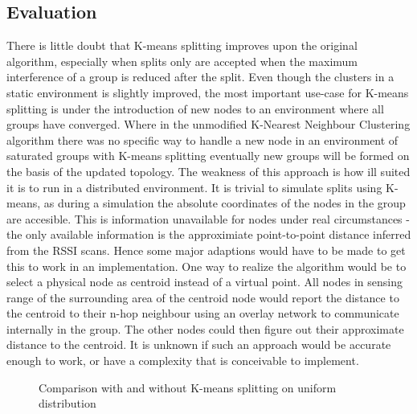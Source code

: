 \subsection{Evaluation}
There is little doubt that K-means splitting improves upon the original algorithm, especially when splits only are accepted when the maximum interference of a group is reduced after the split.
Even though the clusters in a static environment is slightly improved, the most important use-case for K-means splitting is under the introduction of new nodes to an environment
where all groups have converged. Where in the unmodified K-Nearest Neighbour Clustering algorithm there was no specific way to handle a new node in an environment of saturated groups
with K-means splitting eventually new groups will be formed on the basis of the updated topology. The weakness of this approach is how ill suited it is to run in a distributed environment.
It is trivial to simulate splits using K-means, as during a simulation the absolute coordinates of the nodes in the group are accesible. This is information unavailable for nodes under
real circumstances - the only available information is the approximiate point-to-point distance inferred from the RSSI scans.
Hence some major adaptions would have to be made to get this to work in an implementation.
One way to realize the algorithm would be to select a physical node as centroid instead of a virtual point. All nodes in sensing range of the surrounding area of
the centroid node would report the distance to the centroid to their n-hop neighbour using an overlay network to communicate internally in the group. The other nodes could
then figure out their approximate distance to the centroid. It is unknown if such an approach would be accurate enough to work, or have a complexity that is conceivable to implement.  

\begin{figure}
	\centering
		\qquad
		\caption{Comparison with and without K-means splitting on uniform distribution}%
		\label{fig:kmeanscomparisonuniform}%
\end{figure}


